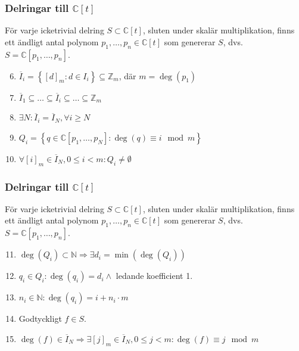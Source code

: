\documentclass{beamer}
\begin{document}
\begin{frame}
	\frametitle{Delringar till $\mathbb{C}[t]$}
	\begin{Theorem}
		För varje icketrivial delring $S \subset \mathbb{C}[t]$, sluten under skalär multiplikation, finns ett ändligt antal polynom $p_1,\ldots,p_n \in \mathbb{C}[t]$ som genererar $S$, dvs. $S=\mathbb{C}[p_1,\ldots,p_n]$.
	\end{Theorem}
	
	\begin{enumerate}
		\setcounter{enumi}{5}
		\item<1->$\overline{I}_i=\left\{[d]_m:d\in I_i \right\} \subseteq \mathbb{Z}_m$, där $m=\deg(p_1)$
		\item<2->$\overline{I}_1 \subseteq \ldots \subseteq \overline{I}_i \subseteq \ldots \subseteq \mathbb{Z}_m$
		\item<3->$\exists N : \overline{I}_i = \overline{I}_N, \forall i \geq N$
		\item<4->$Q_i=\left\{q \in \mathbb{C}[p_1,\ldots,p_N] : \deg(q) \equiv i \mod{m}\right\}$
		\item<5->$\forall [i]_m \in \overline{I}_N, 0 \leq i < m : Q_i \neq \emptyset$
	\end{enumerate}
\end{frame}

\begin{frame}
	\frametitle{Delringar till $\mathbb{C}[t]$}
	\begin{Theorem}
		För varje icketrivial delring $S \subset \mathbb{C}[t]$, sluten under skalär multiplikation, finns ett ändligt antal polynom $p_1,\ldots,p_n \in \mathbb{C}[t]$ som genererar $S$, dvs. $S=\mathbb{C}[p_1,\ldots,p_n]$.
	\end{Theorem}
	
	\begin{enumerate}
		\setcounter{enumi}{10}
		\item<1->$\deg(Q_i) \subset \mathbb{N} \Longrightarrow \exists d_i=\min(\deg(Q_i))$
		\item<2->$q_i \in Q_i: \deg(q_i)=d_i \wedge$ ledande koefficient 1.
		\item<3->$n_i \in \mathbb{N} : \deg(q_i) = i + n_i \cdot m$
		\item<4->Godtyckligt $f \in S$.
		\item<5->$\deg(f)\in \overline{I}_N \Longrightarrow \exists [j]_m \in \overline{I}_N, 0 \leq j < m : \deg(f) \equiv j \mod{m}$
	\end{enumerate}
\end{frame}
\end{document}
